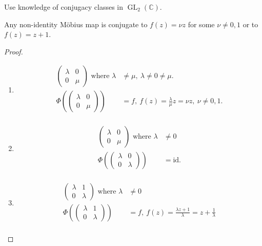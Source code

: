 Use knowledge of conjugacy classes in $\operatorname{GL}_2(\mathbb{C})$.

\begin{theorem} \label{thm:17}
    Any non-identity M\"obius map is conjugate to $f(z) = \nu z$ for some $\nu \neq 0, 1$ or to $f(z) = z + 1$.
\end{theorem} 

\begin{proof}
    \begin{enumerate}
        \item
        \begin{align*}
            \begin{pmatrix}\lambda & 0 \\0 & \mu\end{pmatrix} \text{ where } \lambda &\neq \mu,\ \lambda \neq 0 \neq \mu. \\
            \Phi \left( \begin{pmatrix}\lambda & 0 \\0 & \mu\end{pmatrix} \right) &= f,\ f(z) = \frac{\lambda}{\mu} z = \nu z,\ \nu \neq 0, 1. \\
        \end{align*}
        \item
        \begin{align*}
            \begin{pmatrix}\lambda & 0 \\0 & \mu\end{pmatrix} \text{ where } \lambda &\neq 0 \\
            \Phi \left( \begin{pmatrix}\lambda & 0 \\0 & \lambda \end{pmatrix} \right) &= \text{id}. \\
        \end{align*}
        \item \begin{align*}
            \begin{pmatrix}\lambda & 1 \\0 & \lambda\end{pmatrix} \text{ where } \lambda &\neq 0 \\
            \Phi \left( \begin{pmatrix}\lambda & 1 \\0 & \lambda \end{pmatrix} \right) &= f,\ f(z) = \frac{\lambda z + 1}{\lambda} = z + \frac{1}{\lambda} \\

\end{align*}
\end{enumerate}
\end{proof}
